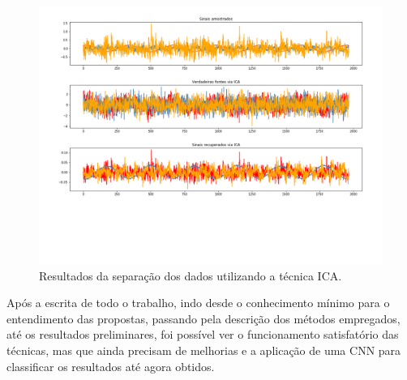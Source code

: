 \begin{figure}[H]
    \caption{Resultados da separação dos dados utilizando a técnica ICA.}
    \begin{center}
        \includegraphics[scale=.4]{resultados/img/ica.png}
    \end{center}
    \label{fig:ica}
\end{figure}

Após a escrita de todo o trabalho, indo desde o conhecimento mínimo para o entendimento das propostas, passando pela descrição dos métodos
empregados, até os resultados preliminares, foi possível ver o funcionamento satisfatório das técnicas, mas que ainda precisam de melhorias
e a aplicação de uma CNN para classificar os resultados até agora obtidos. 

